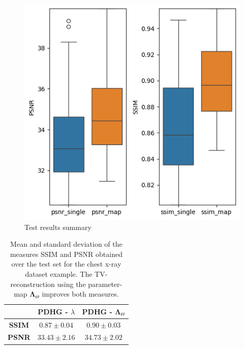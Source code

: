 \documentclass[12pt]{article}
\begin{document}
\newpage








\begin{figure}[ht]
  \centering
  \includegraphics[width=0.5\linewidth]{images//chest_xray/box_plots_1.png}
  \caption{Test results summary}
  \label{fig:box_plots}
\end{figure}


\begin{table}[h!]

\centering
\begin{tabular}{c|c c}
 & \textbf{PDHG -} $\lambda$ & \textbf{PDHG -} $\mathbf{\Lambda}_{\Theta}$ \\
\hline
\textbf{SSIM} & $0.87 \pm 0.04$ & $\mathbf{0.90} \pm 0.03$ \\
\textbf{PSNR} & $33.43 \pm 2.16$ & $\mathbf{34.73} \pm 2.02$ \\
\end{tabular}

\caption{Mean and standard deviation of the measures SSIM and PSNR obtained over the test set for the chest x-ray dataset example. 
The TV-reconstruction using the parameter-map $\mathbf{\Lambda}_{\Theta}$ improves both measures.
}

\label{table:1}

\end{table}
\end{document}
